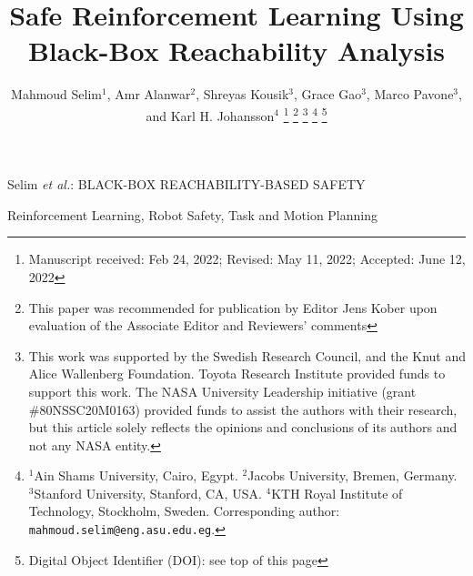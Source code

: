 \documentclass[letterpaper, 10 pt, journal, twoside]{IEEEtran}
\begin{document}
    
\title{Safe Reinforcement Learning Using Black-Box Reachability Analysis}

\author{Mahmoud Selim$^{1}$, Amr Alanwar$^{2}$, Shreyas Kousik$^{3}$, Grace Gao$^{3}$,
Marco Pavone$^{3}$, and Karl H. Johansson$^{4}$
\thanks{Manuscript received: Feb 24, 2022; Revised:
May 11, 2022; Accepted: June 12, 2022}
\thanks{This paper was recommended for publication by
Editor Jens Kober upon evaluation of the Associate Editor and Reviewers’
comments}
\thanks{This work was supported by the Swedish Research Council, and the Knut and Alice Wallenberg Foundation.
Toyota Research Institute provided funds to support this work.
The NASA University Leadership initiative (grant \#80NSSC20M0163) provided funds to assist the authors with their research, but this article solely reflects the opinions and conclusions of its authors and not any NASA entity.}
\thanks{$^{1}$Ain Shams University, Cairo, Egypt.
$^{2}$Jacobs University, Bremen, Germany.
$^{3}$Stanford University, Stanford, CA, USA.
$^{4}$KTH Royal Institute of Technology, Stockholm, Sweden.
Corresponding author: \texttt{mahmoud.selim@eng.asu.edu.eg}.}
\thanks{Digital Object Identifier (DOI): see top of this page}

}

{Selim \MakeLowercase{\textit{et al.}}: BLACK-BOX REACHABILITY-BASED SAFETY} 

\maketitle


\begin{IEEEkeywords}
Reinforcement Learning, Robot Safety, Task and Motion Planning
\end{IEEEkeywords}

%






 
%
% 
% 

% 
\end{document}
